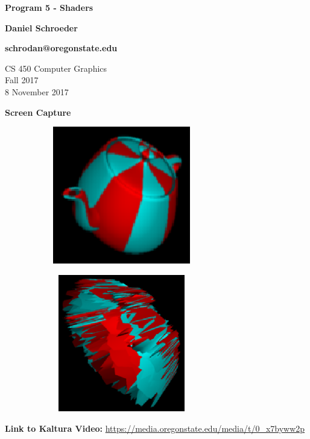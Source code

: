 \documentclass[10pt, draftclsnofoot, onecolumn]{IEEEtran}
\begin{document}
\begin{titlepage}
    \begin{center}
        \vspace*{1.5cm}

        \textbf{Program 5 - Shaders}

        \textbf{Daniel Schroeder}
        
        \textbf{schrodan@oregonstate.edu}

        \vspace{1.5cm}

        CS 450 Computer Graphics\\
        Fall 2017\\
        8 November 2017\\

        \vspace{1.5cm}

        \textbf{Screen Capture}
               \begin{figure}[H]
                   \centering
                   \begin{subfigure}
                       \centering
                       \includegraphics[width=6cm,height=6cm]{normal.eps}
                   \end{subfigure}%
                   \begin{subfigure}
                       \centering
                       \includegraphics[width=6cm,height=6cm]{distort.eps}
                   \end{subfigure}
               \end{figure}
               \vspace{1.5cm}
        \vspace{1.5cm}

        \textbf{Link to Kaltura Video:} 
        \url{https://media.oregonstate.edu/media/t/0_x7byww2p}

    \end{center}
\end{titlepage}
\end{document}
